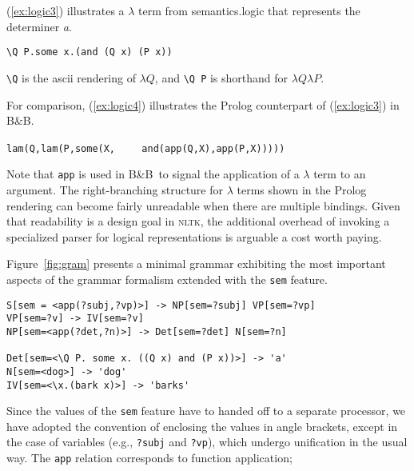 \documentclass[11pt]{article}
\newcommand{\code}[1]{\texttt{#1}}
\newcommand{\ling}[1]{\textit{#1}}
\newcommand{\prog}[1]{\textsf{#1}}
\newcommand{\bnb}{B\&B}
\newcommand{\nltk}{\textsc{nltk}}
\begin{document}
(\ref{ex:logic3}) illustrates a $\lambda$ term from
\prog{semantics.logic} that represents the determiner \ling{a}.
\begin{examples}
\item \verb!\Q P.some x.(and (Q x) (P x))! \label{ex:logic3}
\end{examples}
\verb!\Q! is
the ascii rendering of $\lambda Q$, and  \verb!\Q P! is
shorthand for $\lambda Q \lambda P$. 

For comparison, (\ref{ex:logic4})
illustrates the Prolog counterpart of (\ref{ex:logic3}) in \bnb.
\begin{examples}
\item \label{ex:logic4}
\verb!lam(Q,lam(P,some(X,!
\verb!    and(app(Q,X),app(P,X)))))!
\end{examples}
Note that \verb!app! is used in \bnb\ to signal the application of a
$\lambda$ term to an argument. The right-branching structure for
$\lambda$ terms shown in the Prolog rendering can become fairly
unreadable when there are multiple bindings. Given that readability is
a design goal in \nltk, the additional overhead of invoking a
specialized parser for logical representations is arguable a cost
worth paying.


Figure~\ref{fig:gram} presents a minimal grammar exhibiting the most
important aspects of the grammar formalism extended with the
\code{sem} feature. 
\begin{figure*}[tb]
  \centering
\begin{Verbatim}
S[sem = <app(?subj,?vp)>] -> NP[sem=?subj] VP[sem=?vp]
VP[sem=?v] -> IV[sem=?v]
NP[sem=<app(?det,?n)>] -> Det[sem=?det] N[sem=?n]

Det[sem=<\Q P. some x. ((Q x) and (P x))>] -> 'a'
N[sem=<dog>] -> 'dog'
IV[sem=<\x.(bark x)>] -> 'barks'       
\end{Verbatim}
  \caption{Minimal Grammar with Semantics}
  \label{fig:gram}
\end{figure*}
Since the values of the \code{sem} feature have to handed off to a
separate processor, we have adopted the convention of enclosing the values
in angle brackets, except in the case of variables (e.g., \code{?subj}
and \code{?vp}), which undergo unification in the usual way. The
\code{app} relation corresponds to function application;

\end{document}
